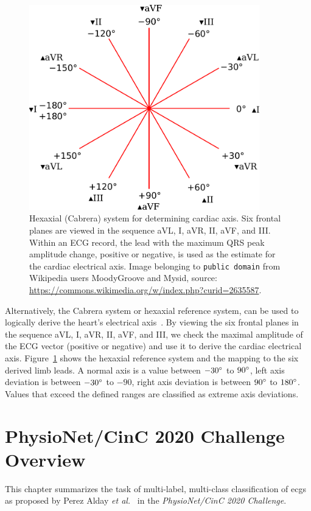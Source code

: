 \documentclass[\main/thesis.tex]{subfiles}
\begin{document}
\begin{figure}
    \centering
    \includegraphics[width=10cm]{figure/Hexaxial_reference_system.pdf}
    \caption{Hexaxial (Cabrera) system for determining cardiac axis. Six frontal planes are viewed in the sequence aVL, I, aVR, II, aVF, and III. Within an ECG record, the lead with the maximum QRS peak amplitude change, positive or negative, is used as the estimate for the cardiac electrical axis.
    Image belonging to \texttt{public domain} from Wikipedia users MoodyGroove and Mysid, source: \url{https://commons.wikimedia.org/w/index.php?curid=2635587}.
    }
    \label{fig:hexaxial_reference}
\end{figure}

Alternatively, the Cabrera system or hexaxial reference system, can be used to logically derive the heart's electrical axis~\cite{lam_classical_2015}.
By viewing the six frontal planes in the sequence aVL, I, aVR, II, aVF, and III, we check the maximal amplitude of the ECG vector (positive or negative) and use it to derive the cardiac electrical axis.
Figure~\ref{fig:hexaxial_reference} shows the hexaxial reference system and the mapping to the six derived limb leads.
A normal axis is a value between $-30\degree$ to $90\degree$, left axis deviation is between $-30\degree$ to $-90$, right axis deviation is between $90\degree$ to $180\degree$.
Values that exceed the defined ranges are classified as extreme axis deviations.

\section{PhysioNet/CinC 2020 Challenge Overview}

This chapter summarizes the task of multi-label, multi-class classification of \gls{ecg}s as proposed by Perez Alday \emph{et al.}~\cite{physionet_challenge_2020} in the \emph{PhysioNet/CinC 2020 Challenge}.
\end{document}
